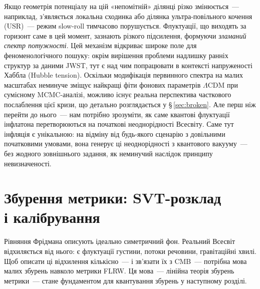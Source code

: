 \documentclass[12pt, a4paper]{article}
\begin{document}
Якщо геометрія потенціалу на цій «непомітній» ділянці різко
змінюється~--- наприклад, з'являється локальна сходинка або ділянка
ультра-повільного кочення (USR)~--- режим slow-roll тимчасово
порушується. Флуктуації, що виходять за горизонт саме в цей момент,
зазнають різкого підсилення, формуючи \emph{зламаний спектр
потужності}. Цей механізм відкриває широке поле для феноменологічного
пошуку: окрім вирішення проблеми надлишку ранніх структур за даними JWST,
тут є над чим попрацювати в контексті напруженості Хаббла (Hubble tension).
Оскільки модифікація первинного спектра на малих масштабах неминуче
зміщує найкращі фіти фонових параметрів $\Lambda$CDM при сумісному MCMC-аналізі,
можливо існує реальна перспектива часткового послаблення цієї кризи, що
детально розглядається у §\,\ref{sec:broken}. Але перш ніж перейти
до нього~--- нам потрібно зрозуміти, як саме квантові флуктуації
інфлатона перетворюються на початкові неоднорідності Всесвіту.
Саме тут інфляція є унікальною: на відміну від будь-якого
сценарію з довільними початковими умовами, вона генерує ці
неоднорідності з квантового вакууму~--- без жодного зовнішнього
задання, як неминучий наслідок принципу невизначеності.


\section{Збурення метрики: SVT-розклад\\ і калібрування}
\label{sec:metric}

Рівняння Фрідмана описують ідеально симетричний фон.
Реальний Всесвіт відхиляється від нього: є флуктуації густини,
потоки речовини, гравітаційні хвилі. Щоб описати ці відхилення
кількісно~--- і зв'язати їх з CMB~--- потрібна мова малих збурень
навколо метрики FLRW. Ця мова~--- лінійна теорія збурень метрики~---
стане фундаментом для квантування збурень у наступному розділі.
\end{document}
